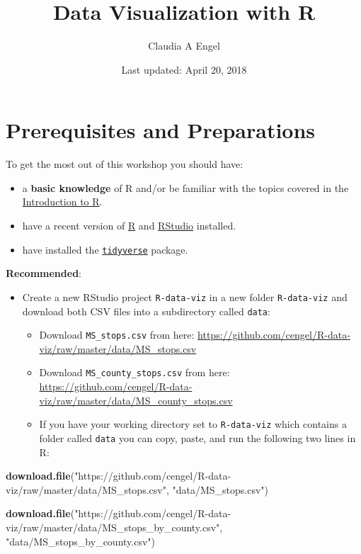 \documentclass[]{book}
\title{Data Visualization with R}
\author{Claudia A Engel}
\date{Last updated: April 20, 2018}
\newenvironment{Shaded}{\begin{snugshade}}{\end{snugshade}}
\newcommand{\KeywordTok}[1]{\textcolor[rgb]{0.13,0.29,0.53}{\textbf{#1}}}
\newcommand{\StringTok}[1]{\textcolor[rgb]{0.31,0.60,0.02}{#1}}
\newcommand{\NormalTok}[1]{#1}
\providecommand{\tightlist}{%
  \setlength{\itemsep}{0pt}\setlength{\parskip}{0pt}}
\theoremstyle{definition}
\theoremstyle{definition}
\theoremstyle{definition}
\theoremstyle{remark}
\begin{document}
\maketitle

{
\setcounter{tocdepth}{1}
\tableofcontents
}
\chapter*{Prerequisites and
Preparations}\label{prerequisites-and-preparations}

To get the most out of this workshop you should have:

\begin{itemize}
\tightlist
\item
  a \textbf{basic knowledge} of R and/or be familiar with the topics
  covered in the \href{https://cengel.github.io/R-intro/}{Introduction
  to R}.
\item
  have a recent version of \href{https://cran.r-project.org/}{R} and
  \href{https://www.rstudio.com/}{RStudio} installed.
\item
  have installed the \href{http://tidyverse.org/}{\texttt{tidyverse}}
  package.
\end{itemize}

\textbf{Recommended}:

\begin{itemize}
\tightlist
\item
  Create a new RStudio project \texttt{R-data-viz} in a new folder
  \texttt{R-data-viz} and download both CSV files into a subdirectory
  called \texttt{data}:

  \begin{itemize}
  \tightlist
  \item
    Download \texttt{MS\_stops.csv} from here:
    \url{https://github.com/cengel/R-data-viz/raw/master/data/MS_stops.csv}
  \item
    Download \texttt{MS\_county\_stops.csv} from here:
    \url{https://github.com/cengel/R-data-viz/raw/master/data/MS_county_stops.csv}
  \item
    If you have your working directory set to \texttt{R-data-viz} which
    contains a folder called \texttt{data} you can copy, paste, and run
    the following two lines in R:
  \end{itemize}
\end{itemize}

\begin{Shaded}
\begin{Highlighting}[]
\KeywordTok{download.file}\NormalTok{(}\StringTok{"https://github.com/cengel/R-data-viz/raw/master/data/MS_stops.csv"}\NormalTok{, }
              \StringTok{"data/MS_stops.csv"}\NormalTok{)}

\KeywordTok{download.file}\NormalTok{(}\StringTok{"https://github.com/cengel/R-data-viz/raw/master/data/MS_stops_by_county.csv"}\NormalTok{, }
              \StringTok{"data/MS_stops_by_county.csv"}\NormalTok{)}
\end{Highlighting}
\end{Shaded}
\end{document}
